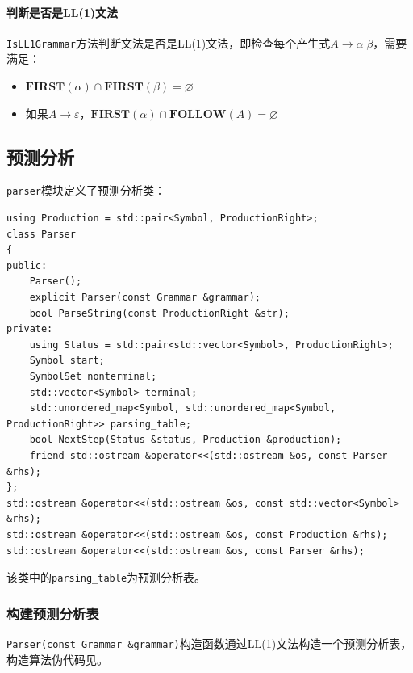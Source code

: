 \documentclass[lang=cn,11pt,a4paper,cite=authornum]{paper}
\begin{document}
\paragraph{判断是否是LL(1)文法} \texttt{IsLL1Grammar}方法判断文法是否是LL(1)文法，即检查每个产生式$A\rightarrow\alpha|\beta$，需要满足：

\begin{itemize}
    \item $\mathbf{FIRST}(\alpha)\cap\mathbf{FIRST}(\beta)=\varnothing$
    \item 如果$A\rightarrow\varepsilon$，$\mathbf{FIRST}(\alpha)\cap\mathbf{FOLLOW}(A)=\varnothing$
\end{itemize}

\subsection{预测分析}

\texttt{parser}模块定义了预测分析类：

\begin{code}
\begin{verbatim}
using Production = std::pair<Symbol, ProductionRight>;
class Parser
{
public:
    Parser();
    explicit Parser(const Grammar &grammar);
    bool ParseString(const ProductionRight &str);
private:
    using Status = std::pair<std::vector<Symbol>, ProductionRight>;
    Symbol start;
    SymbolSet nonterminal;
    std::vector<Symbol> terminal;
    std::unordered_map<Symbol, std::unordered_map<Symbol, ProductionRight>> parsing_table;
    bool NextStep(Status &status, Production &production);
    friend std::ostream &operator<<(std::ostream &os, const Parser &rhs);
};
std::ostream &operator<<(std::ostream &os, const std::vector<Symbol> &rhs);
std::ostream &operator<<(std::ostream &os, const Production &rhs);
std::ostream &operator<<(std::ostream &os, const Parser &rhs);
\end{verbatim}
\end{code}

该类中的\texttt{parsing_table}为预测分析表。

\subsubsection{构建预测分析表}

\texttt{Parser(const Grammar &grammar)}构造函数通过LL(1)文法构造一个预测分析表，构造算法伪代码见。
\end{document}
